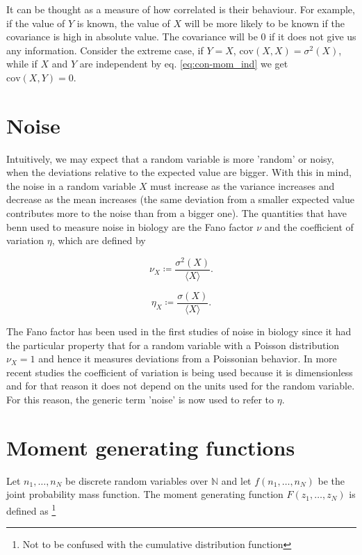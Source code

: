 It can be thought as a measure of how correlated is their behaviour. For example, if the value of $Y$ is known, the value of $X$ will be more likely to be known if the covariance is high in absolute value. The covariance will be $0$ if it does not give us any information. Consider the extreme case, if $Y=X$, $\text{cov}(X,X) = \sigma^2(X)$, while if $X$ and $Y$ are independent by eq. \eqref{eq:con-mom_ind} we get $\text{cov}(X,Y) = 0$.

\section{Noise}
\label{sec:con-noise}
Intuitively, we may expect that a random variable is more 'random' or noisy, when the deviations relative to the expected value are bigger. With this in mind, the noise in a random variable $X$ must increase as the variance increases and decrease as the mean increases (the same deviation from a smaller expected value contributes more to the noise than from a bigger one). The quantities that have benn used to measure noise in biology are the Fano factor $\nu$ and the coefficient of variation $\eta$, which are defined by

\begin{equation}
  \label{eq:con-fano_def}
  \nu_X \coloneqq \frac{\sigma^2(X)}{\langle X \rangle}.
\end{equation}

\begin{equation}
  \label{eq:con-cv_def}
  \eta_X \coloneqq \frac{\sigma(X)}{\langle X \rangle}.
\end{equation}

The Fano factor has been used in the first studies of noise in biology since it had the particular property that for a random variable with a Poisson distribution $\nu_X=1$ and hence it measures deviations from a Poissonian behavior. In more recent studies the coefficient of variation is being used because it is dimensionless and for that reason it does not depend on the units used for the random variable. For this reason, the generic term 'noise' is now used to refer to $\eta$.

\section{Moment generating functions}

Let $n_1,\dotsc,n_N$ be discrete random variables over $\mathbb{N}$ and let $f(n_1,\dotsc,n_N)$ be the joint probability mass function. The moment generating function $F(z_1,\dotsc,z_N)$ is defined as \footnote{Not to be confused with the cumulative distribution function}


